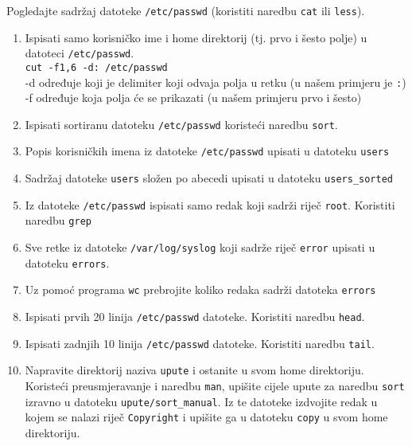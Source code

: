 
\begin{zadatak} Pogledajte sadržaj datoteke \texttt{/etc/passwd} (koristiti naredbu \texttt{cat} ili \texttt{less}).


\begin{enumerate}

\item Ispisati samo korisničko ime i home direktorij (tj. prvo i šesto polje) u datoteci \texttt{/etc/passwd}.\\
 \lstinline!cut -f1,6 -d: /etc/passwd!\\
-d određuje koji je delimiter koji odvaja polja u retku (u našem primjeru je \lstinline!:!)\\
-f određuje koja polja će se prikazati (u našem primjeru prvo i šesto)

\item Ispisati sortiranu datoteku \texttt{/etc/passwd} koristeći naredbu \texttt{sort}.
\item Popis korisničkih imena iz datoteke \texttt{/etc/passwd} upisati u datoteku \texttt{users}
\item Sadržaj datoteke \texttt{users} složen po abecedi upisati u datoteku \texttt{users\_sorted}
\item Iz datoteke \texttt{/etc/passwd} ispisati samo redak koji sadrži riječ \texttt{root}. Koristiti naredbu \texttt{grep}
\item Sve retke iz datoteke \texttt{/var/log/syslog} koji sadrže riječ \texttt{error} upisati u datoteku \texttt{errors}.
\item Uz pomoć programa \texttt{wc} prebrojite koliko redaka sadrži datoteka \texttt{errors}
\item Ispisati prvih 20 linija \texttt{/etc/passwd} datoteke. Koristiti naredbu \texttt{head}.
\item Ispisati zadnjih 10 linija \texttt{/etc/passwd} datoteke. Koristiti naredbu \texttt{tail}.
\item Napravite direktorij naziva \texttt{upute} i ostanite u svom home direktoriju. Koristeći preusmjeravanje i naredbu \texttt{man}, upišite cijele upute za naredbu \texttt{sort} izravno u datoteku \texttt{upute/sort\_manual}. Iz te datoteke izdvojite redak u kojem se nalazi riječ \texttt{Copyright} i upišite ga u datoteku \texttt{copy} u svom home direktoriju.



\end{enumerate}
\end{zadatak}

